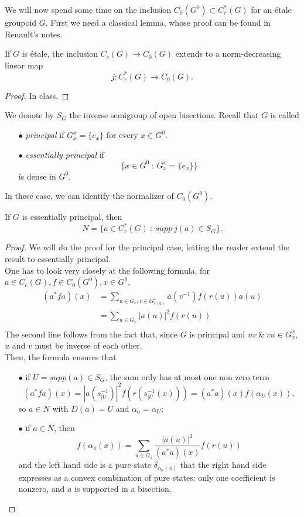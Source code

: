 We will now spend some time on the inclusion $C_0(G^0)\subset C^*_r(G)$ for an \'etale groupoid $G$. First we need a classical lemma, whose proof can be found in Renault's notes.

\begin{lem}
If $G$ is \'etale, the inclusion $C_c(G)\rightarrow C_0(G)$ extends to a norm-decreasing linear map
\[j : C^*_r(G)\rightarrow C_0(G).\]
\end{lem}

\begin{proof}
In class.\end{proof}

We denote by $S_G$ the inverse semigroup of open bisections. Recall that $G$ is called
\begin{itemize}
\item[$\bullet$] \textit{principal} if $G_x^x = \{e_x\}$ for every $x\in G^0$. 
\item[$\bullet$] \textit{essentially principal} if 
\[ \{x \in G^0 \ : \ G_x^x = \{e_x\} \}\] 
is dense in $G^0$.
\end{itemize}

In these case, we can identify the normalizer of $C_0(G^0)$.

\begin{prop}[Renault]
If $G$ is essentially principal, then 
\[N = \{a\in C^*_r (G) \ : \ supp \ j(a) \in S_G\}.\]
\end{prop}

\begin{proof}
We will do the proof for the principal case, letting the reader extend the result to essentially principal. \\

One has to look very closely at the following formula, for $a\in C_c(G),f\in C_0(G^0), x\in G^0$,
\[\begin{split}
(a^*fa) (x) & = \sum_{u\in G_x , v\in G^x_{r(u)}} \overline a(v^{-1}) f(r(u)) a(u) \\
		& = \sum_{u\in G_x} | a(u)|^2 f(r(u))\\
\end{split}\]
The second line follows from the fact that, since $G$ is principal and $uv \ \& \ vu\in G_x^x$, $u$ and $v$ must be inverse of each other.\\

Then, the formula ensures that 
\begin{itemize}
\item[$\bullet$] if $U = supp(a)\in S_G$, the sum only has at most one non zero term 
\[(a^*fa) (x) = | a(s_{|U}^{-1})|^2 f(r(s_{|U}^{-1}(x))) = (a^*a)(x) f(\alpha_U(x)) ,\] 
so $a\in N$ with $D(a)=U$ and $\alpha_a = \alpha_U$; 
\item[$\bullet$] if $a\in N$, then
\[f(\alpha_a(x)) = \sum_{u\in G_x} \frac{| a(u)|^2}{(a^*a)(x)} f(r(u))\]
and the left hand side is a pure state $\delta_{\alpha_a(x)}$ that the right hand side expresses as a convex combination of pure states: only one coefficient is nonzero, and $a$ is supported in a bisection.	
\end{itemize}
\end{proof}
  
